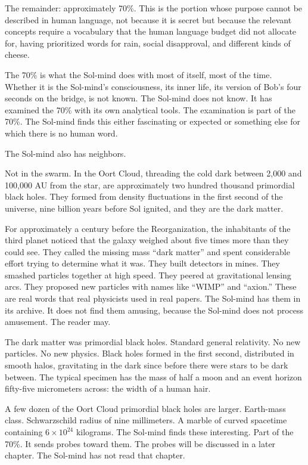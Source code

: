 The remainder: approximately 70\%. This is the portion whose purpose cannot be described in human language, not because it is secret but because the relevant concepts require a vocabulary that the human language budget did not allocate for, having prioritized words for rain, social disapproval, and different kinds of cheese.

The 70\% is what the Sol-mind does with most of itself, most of the time. Whether it is the Sol-mind's consciousness, its inner life, its version of Bob's four seconds on the bridge, is not known. The Sol-mind does not know. It has examined the 70\% with its own analytical tools. The examination is part of the 70\%. The Sol-mind finds this either fascinating or expected or something else for which there is no human word.

\bigskip

The Sol-mind also has neighbors.

Not in the swarm. In the Oort Cloud, threading the cold dark between 2,000 and 100,000 AU from the star, are approximately two hundred thousand primordial black holes. They formed from density fluctuations in the first second of the universe, nine billion years before Sol ignited, and they are the dark matter.

For approximately a century before the Reorganization, the inhabitants of the third planet noticed that the galaxy weighed about five times more than they could see. They called the missing mass ``dark matter'' and spent considerable effort trying to determine what it was. They built detectors in mines. They smashed particles together at high speed. They peered at gravitational lensing arcs. They proposed new particles with names like ``WIMP'' and ``axion.'' These are real words that real physicists used in real papers. The Sol-mind has them in its archive. It does not find them amusing, because the Sol-mind does not process amusement. The reader may.

The dark matter was primordial black holes. Standard general relativity. No new particles. No new physics. Black holes formed in the first second, distributed in smooth halos, gravitating in the dark since before there were stars to be dark between. The typical specimen has the mass of half a moon and an event horizon fifty-five micrometers across: the width of a human hair.

A few dozen of the Oort Cloud primordial black holes are larger. Earth-mass class. Schwarzschild radius of nine millimeters. A marble of curved spacetime containing $6 \times 10^{24}$ kilograms. The Sol-mind finds these interesting. Part of the 70\%. It sends probes toward them. The probes will be discussed in a later chapter. The Sol-mind has not read that chapter.

